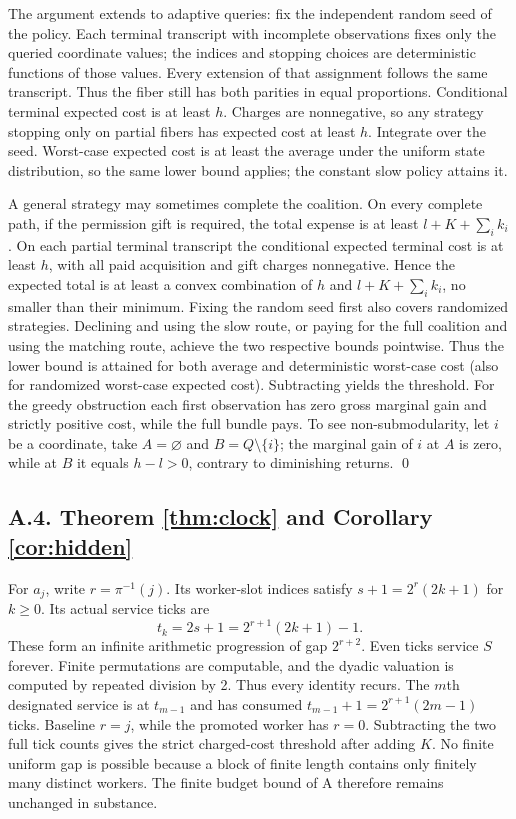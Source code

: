 \documentclass[11pt,letterpaper]{article}
\begin{document}
The argument extends to adaptive queries: fix the independent random seed of the policy. Each terminal transcript with incomplete observations fixes only the queried coordinate values; the indices and stopping choices are deterministic functions of those values. Every extension of that assignment follows the same transcript. Thus the fiber still has both parities in equal proportions. Conditional terminal expected cost is at least $h$. Charges are nonnegative, so any strategy stopping only on partial fibers has expected cost at least $h$. Integrate over the seed. Worst-case expected cost is at least the average under the uniform state distribution, so the same lower bound applies; the constant slow policy attains it.

A general strategy may sometimes complete the coalition. On every complete path, if the permission gift is required, the total expense is at least $l+K+\sum_i k_i$. On each partial terminal transcript the conditional expected terminal cost is at least $h$, with all paid acquisition and gift charges nonnegative. Hence the expected total is at least a convex combination of $h$ and $l+K+\sum_i k_i$, no smaller than their minimum. Fixing the random seed first also covers randomized strategies. Declining and using the slow route, or paying for the full coalition and using the matching route, achieve the two respective bounds pointwise. Thus the lower bound is attained for both average and deterministic worst-case cost (also for randomized worst-case expected cost). Subtracting yields the threshold. For the greedy obstruction each first observation has zero gross marginal gain and strictly positive cost, while the full bundle pays. To see non-submodularity, let $i$ be a coordinate, take $A=\varnothing$ and $B=Q\setminus\{i\}$; the marginal gain of $i$ at $A$ is zero, while at $B$ it equals $h-l>0$, contrary to diminishing returns. \qed

\subsection*{A.4. Theorem \ref{thm:clock} and Corollary \ref{cor:hidden}}
For $a_j$, write $r=\pi^{-1}(j)$. Its worker-slot indices satisfy $s+1=2^r(2k+1)$ for $k\ge0$. Its actual service ticks are
\[
 t_k=2s+1=2^{r+1}(2k+1)-1.
\]
These form an infinite arithmetic progression of gap $2^{r+2}$. Even ticks service $S$ forever. Finite permutations are computable, and the dyadic valuation is computed by repeated division by 2. Thus every identity recurs. The $m$th designated service is at $t_{m-1}$ and has consumed $t_{m-1}+1=2^{r+1}(2m-1)$ ticks. Baseline $r=j$, while the promoted worker has $r=0$. Subtracting the two full tick counts gives the strict charged-cost threshold after adding $K$. No finite uniform gap is possible because a block of finite length contains only finitely many distinct workers. The finite budget bound of A therefore remains unchanged in substance.
\end{document}
